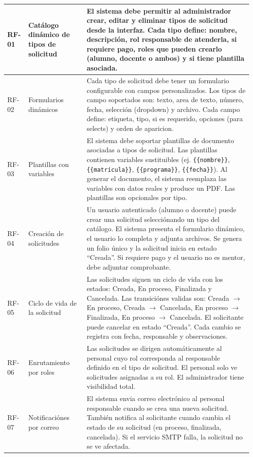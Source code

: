 \begin{longtable}{|C{1cm}|L{4.5cm}|L{8cm}|}
    RF-01 & Catálogo dinámico de tipos de solicitud & El sistema debe permitir al administrador crear, editar y eliminar tipos de solicitud desde la interfaz. Cada tipo define: nombre, descripción, rol responsable de atenderla, si requiere pago, roles que pueden crearlo (alumno, docente o ambos) y si tiene plantilla asociada. \\
    \hline
    RF-02 & Formularios dinámicos & Cada tipo de solicitud debe tener un formulario configurable con campos personalizados. Los tipos de campo soportados son: texto, area de texto, número, fecha, selección (dropdown) y archivo. Cada campo define: etiqueta, tipo, si es requerido, opciones (para selects) y orden de aparicion. \\
    \hline
    RF-03 & Plantillas con variables & El sistema debe soportar plantillas de documento asociadas a tipos de solicitud. Las plantillas contienen variables sustituibles (ej. \texttt{\{\{nombre\}\}}, \texttt{\{\{matrícula\}\}}, \texttt{\{\{programa\}\}}, \texttt{\{\{fecha\}\}}). Al generar el documento, el sistema reemplaza las variables con datos reales y produce un PDF. Las plantillas son opcionales por tipo. \\
    \hline
    RF-04 & Creación de solicitudes & Un usuario autenticado (alumno o docente) puede crear una solicitud selecciónando un tipo del catálogo. El sistema presenta el formulario dinámico, el usuario lo completa y adjunta archivos. Se genera un folio único y la solicitud inicia en estado ``Creada''. Si requiere pago y el usuario no es mentor, debe adjuntar comprobante. \\
    \hline
    RF-05 & Ciclo de vida de la solicitud & Las solicitudes siguen un ciclo de vida con los estados: Creada, En proceso, Finalizada y Cancelada. Las transiciónes validas son: Creada $\rightarrow$ En proceso, Creada $\rightarrow$ Cancelada, En proceso $\rightarrow$ Finalizada, En proceso $\rightarrow$ Cancelada. El solicitante puede cancelar en estado ``Creada''. Cada cambio se registra con fecha, responsable y observaciones. \\
    \hline
    RF-06 & Enrutamiento por roles & Las solicitudes se dirigen automáticamente al personal cuyo rol corresponda al responsable definido en el tipo de solicitud. El personal solo ve solicitudes asignadas a su rol. El administrador tiene visibilidad total. \\
    \hline
    RF-07 & Notificaciónes por correo & El sistema envia correo electrónico al personal responsable cuando se crea una nueva solicitud. También notifica al solicitante cuando cambia el estado de su solicitud (en proceso, finalizada, cancelada). Si el servicio SMTP falla, la solicitud no se ve afectada. \\

\end{longtable}
